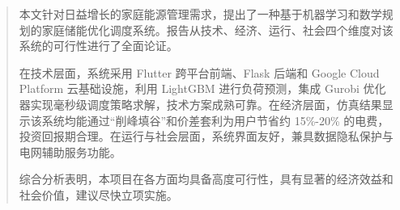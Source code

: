 \begin{abstract}
    本文针对日益增长的家庭能源管理需求，提出了一种基于机器学习和数学规划的家庭储能优化调度系统。报告从技术、经济、运行、社会四个维度对该系统的可行性进行了全面论证。

    在技术层面，系统采用 Flutter 跨平台前端、Flask 后端和 Google Cloud Platform 云基础设施，利用 LightGBM 进行负荷预测，集成 Gurobi 优化器实现毫秒级调度策略求解，技术方案成熟可靠。在经济层面，仿真结果显示该系统均能通过“削峰填谷”和价差套利为用户节省约 15\%-20\% 的电费，投资回报期合理。在运行与社会层面，系统界面友好，兼具数据隐私保护与电网辅助服务功能。

    综合分析表明，本项目在各方面均具备高度可行性，具有显著的经济效益和社会价值，建议尽快立项实施。
\end{abstract}

